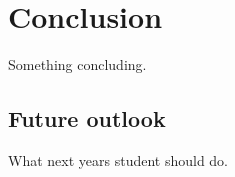 \chapter{Conclusion\label{cha:conclusion}}

Something concluding.

\section{Future outlook}

What next years student should do.